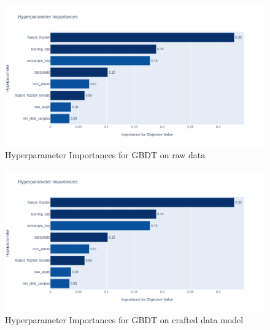 \begin{figure}[h]
	\centering
	\includegraphics[width=\linewidth]{figures/HPO/GBDT_HPO_Raw_Importances.png}
	\caption{Hyperparameter Importances for GBDT on raw data}
	\label{fig:GBDT_HPO_Raw}
\end{figure}
\begin{figure}[h]
	\centering
	\includegraphics[width=\linewidth]{figures/HPO/GBDT_HPO_Crafted_Importances.png}
	\caption{Hyperparameter Importances for GBDT on crafted data model}
	\label{fig:GBDT_HPO_Crafted}
\end{figure}

